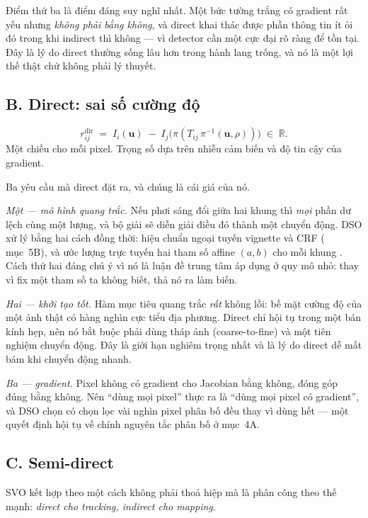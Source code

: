 \documentclass[../../vslam.tex]{subfiles}
\begin{document}
Điểm thứ ba là điểm đáng suy nghĩ nhất. Một bức tường trắng có gradient rất yếu nhưng \emph{không phải bằng không}, và direct khai thác được phần thông tin ít ỏi đó trong khi indirect thì không --- vì detector cần một cực đại rõ ràng để tồn tại. Đây là lý do direct thường sống lâu hơn trong hành lang trống, và nó là một lợi thế thật chứ không phải lý thuyết.

\subsection{B. Direct: sai số cường độ}

\[
r^{\text{dir}}_{ij} \;=\; I_i(\mathbf{u}) \;-\; I_j\bigl(\pi(T_{ij}\,\pi^{-1}(\mathbf{u}, \rho))\bigr) \;\in\; \mathbb{R}.
\]
Một chiều cho mỗi pixel. Trọng số dựa trên nhiễu cảm biến và độ tin cậy của gradient.

Ba yêu cầu mà direct đặt ra, và chúng là cái giá của nó.

\emph{Một --- mô hình quang trắc.} Nếu phơi sáng đổi giữa hai khung thì \emph{mọi} phần dư lệch cùng một lượng, và bộ giải sẽ diễn giải điều đó thành một chuyển động. DSO xử lý bằng hai cách đồng thời: hiệu chuẩn ngoại tuyến vignette và CRF ( mục~5B), và ước lượng trực tuyến hai tham số affine \((a,b)\) cho mỗi khung \cite{engel2018dso}. Cách thứ hai đáng chú ý vì nó là luận đề trung tâm áp dụng ở quy mô nhỏ: thay vì fix một tham số ta không biết, thả nó ra làm biến.

\emph{Hai --- khởi tạo tốt.} Hàm mục tiêu quang trắc \emph{rất} không lồi: bề mặt cường độ của một ảnh thật có hàng nghìn cực tiểu địa phương. Direct chỉ hội tụ trong một bán kính hẹp, nên nó bắt buộc phải dùng tháp ảnh (coarse-to-fine) và một tiên nghiệm chuyển động. Đây là giới hạn nghiêm trọng nhất và là lý do direct dễ mất bám khi chuyển động nhanh.

\emph{Ba --- gradient.} Pixel không có gradient cho Jacobian bằng không, đóng góp đúng bằng không. Nên ``dùng mọi pixel'' thực ra là ``dùng mọi pixel có gradient'', và DSO chọn có chọn lọc vài nghìn pixel phân bố đều thay vì dùng hết --- một quyết định hội tụ về chính nguyên tắc phân bố ở  mục~4A.

\subsection{C. Semi-direct}

SVO \cite{forster2017svo} kết hợp theo một cách không phải thoả hiệp mà là phân công theo thế mạnh: \emph{direct cho tracking, indirect cho mapping}.
\end{document}

